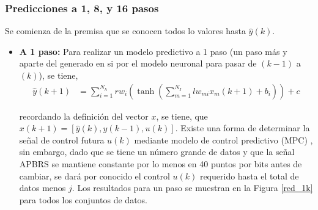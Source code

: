 \documentclass[12pt]{article}
\begin{document}
\subsubsection{Predicciones a 1, 8, y 16
	pasos}
	Se comienza de la premisa que se conocen todos lo valores hasta $\hat{y}(k)$.
\begin{itemize}
	\item \textbf{A 1 paso:}
	Para realizar un modelo predictivo a 1 paso (un paso más y aparte del generado en si por el modelo neuronal para pasar de $(k-1)$ a $(k)$), se tiene,
	\begin{align}
	\hat{y}(k+1) &= \sum_{i=1}^{N_h} rw_i \left( \tanh\left(\sum_{m=1}^{N_I} lw_{mi} x_{m}(k + 1) + b_i\right)\right) + c
	\label{mat_red_j}
	\end{align}

	recordando la definición del vector $x$, se tiene, que $x(k+1) = [\hat{y}(k), y(k-1), u(k)]$. Existe una forma de determinar la señal de control futura $u(k)$ mediante modelo de control predictivo (MPC) \cite{norgaard_neural_2000}, sin embargo, dado que se tiene un número grande de datos y que la señal APBRS se mantiene constante por lo menos en 40 puntos por bits antes de cambiar, se dará por conocido el control $u(k)$ requerido hasta el total de datos menos $j$. Los resultados para un paso se muestran en la Figura \ref{red_1k} para todos los conjuntos de datos.
	\begin{figure}[h!]
		\centering
		\captionsetup{justification=centering}
		\newline
\end{figure}
\end{itemize}
\end{document}
